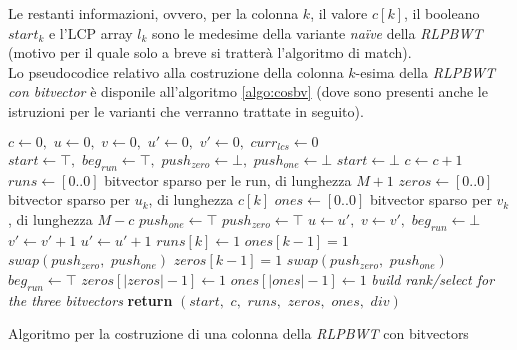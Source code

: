 Le restanti informazioni, ovvero, per la colonna $k$, il valore $c[k]$, il
booleano $start_k$ e l'LCP array $l_k$ sono le medesime della variante
\textit{na\"{i}ve} della \textit{RLPBWT} (motivo per il quale solo a breve si
tratterà l'algoritmo di match).\\
Lo pseudocodice relativo alla costruzione della colonna $k$-esima della
\textit{RLPBWT con bitvector} è disponile all'algoritmo \ref{algo:cosbv} (dove
sono presenti anche le istruzioni per le varianti che verranno trattate in
seguito).
\begin{algorithm}
  \small
  \begin{algorithmic}[1]
    \State $c\gets 0,\,\,u\gets 0,\,\,v\gets 0,\,\,u'\gets 0,\,\, v'\gets
    0,\,\,curr_{lcs}\gets 0$
    \State $start \gets \top,\,\,beg_{run}\gets \top,\,\,push_{zero}\gets
    \bot,\,\,push_{one}\gets \bot$
    \For {\textit{every} $k\in\left[0,\,\, M\right)$}
    \State $start \gets \bot$
    \EndIf
    \State $c\gets c+1$
    \EndIf
    \EndFor
    \State $runs\gets[0..0]$
    \Comment bitvector sparso per le run, di lunghezza $M+1$
    \State $zeros\gets[0..0]$
    \Comment bitvector sparso per $u_k$, di lunghezza $c[k]$
    \State $ones\gets[0..0]$
    \Comment bitvector sparso per $v_k$, di lunghezza $M-c$
    \State $push_{one}\gets \top$
    \Else
    \State $push_{zero}\gets \top$
    \EndIf
    \For {\textit{every} $k\in\left[0,\,\, M\right)$}
    \State $u\gets u',\,\,v\gets v',\,\,beg_{run}\gets \bot$
    \EndIf
    \State $v'\gets v'+1$
    \Else
    \State $u'\gets u'+1$
    \EndIf
    \State $runs[k]\gets 1$
    \State $ones[k-1]=1$
    \EndIf
    \State $swap(push_{zero},\,\,push_{one})$
    \Else
    \State $zeros[k-1]=1$
    \EndIf
    \State $swap(push_{zero},\,\,push_{one})$
    \EndIf
    \State $beg_{run}\gets \top$
    \EndIf
    \EndFor
    \State $zeros[|zeros|-1]\gets 1$
    \EndIf
    \State $ones[|ones|-1]\gets 1$
    \EndIf
    \State \textit{build rank/select for the three bitvectors}
    \State \textbf{return}
    $(start,\,\,c,\,\,runs,\,\,zeros,\,\,ones,\,\,div)$  
    \EndFunction
  \end{algorithmic}
  \caption{{\footnotesize{Algoritmo per la costruzione di una colonna della
  \textit{RLPBWT} con bitvectors}}}
  \label{algo:cosbv}
\end{algorithm}

